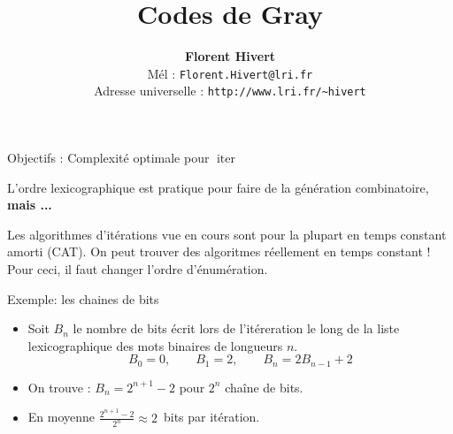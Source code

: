 \documentclass{beamer}
\title[Codes de Gray combinatoires]%
{\bf Codes de Gray}
\author{\textbf{\Large Florent Hivert}\\[5mm]
  Mél : \texttt{Florent.Hivert@lri.fr}\\
  Adresse universelle : \texttt{http://www.lri.fr/\~{ }hivert}
}
\date{}
\def\opstyle#1{\ensuremath{\operatorname{#1}}}
\begin{document}
\newcommand{\Count}{\opstyle{count}}
\newcommand{\List}{\opstyle{list}}
\newcommand{\Iter}{\opstyle{iter}}
\newcommand{\Unrank}{\opstyle{unrank}}
\newcommand{\Rank}{\opstyle{rank}}
\newcommand{\First}{\opstyle{first}}
\newcommand{\Next}{\opstyle{next}}
\newcommand{\Random}{\opstyle{random}}

\newcommand{\Concat}{\opstyle{concat}}
\newcommand{\BS}{\opstyle{BitString}}
\newcommand{\Perm}{\opstyle{Perm}}
\newcommand{\Union}{\opstyle{Union}}
\newcommand{\Prod}{\opstyle{Prod}}

\newcommand{\Pos}{\opstyle{Pos}}
\newcommand{\Bin}{\opstyle{Bin}}
\newcommand{\Gray}{\opstyle{Gray}}

\newcommand{\mA}{\mathcal{A}}
\newcommand{\mB}{\mathcal{B}}
\newcommand{\mC}{\mathcal{C}}
\newcommand{\mD}{\mathcal{D}}
\newcommand{\mE}{\mathcal{E}}
\newcommand{\mI}{\mathcal{I}}
\newcommand{\mZ}{\mathcal{Z}}

\newcommand{\Oh}{O}

\frame{\titlepage}
\begin{frame}{Objectifs : Complexité optimale pour $\Iter$}

  L'ordre lexicographique est pratique pour faire de la génération
  combinatoire, \textbf{mais ...}
  \bigskip

  \begin{NOTE}
    Les algorithmes d'itérations vue en cours sont pour la plupart en temps
    constant amorti (CAT). On peut trouver des algoritmes réellement en temps
    constant ! Pour ceci, il faut changer l'ordre d'énumération.
  \end{NOTE}
\end{frame}

\begin{frame}{Exemple: les chaines de bits}

  \begin{itemize}
  \item Soit $B_n$ le nombre de bits écrit lors de l'itéreration le long de la
    liste lexicographique des mots binaires de longueurs $n$.
  \[B_0 = 0,\qquad B_1=2,\qquad B_{n} = 2B_{n-1}+2\]
  \bigskip\pause

  \item On trouve : $B_n = 2^{n+1} - 2$ pour $2^n$ chaîne de bits.
  \bigskip\pause

  \item En moyenne $\frac{2^{n+1} - 2}{2^n}\approx 2$~bits par itération.
  \end{itemize}
\end{frame}
\end{document}
